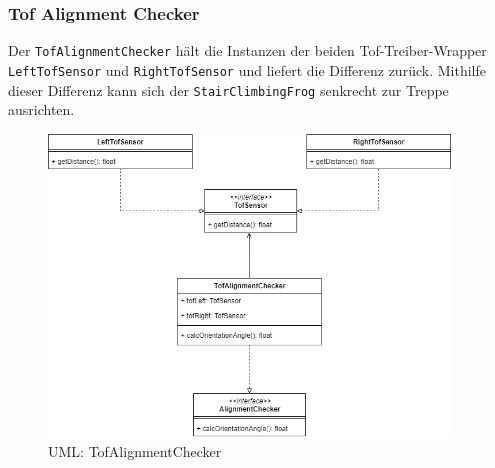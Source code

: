 \subsubsection{Tof Alignment Checker}
Der \texttt{TofAlignmentChecker} hält die Instanzen der beiden Tof-Treiber-Wrapper \texttt{LeftTofSensor} und \texttt{RightTofSensor} und liefert die Differenz zurück. Mithilfe dieser Differenz kann sich der \texttt{StairClimbingFrog} senkrecht zur Treppe ausrichten.
\begin{figure}[H]
  \includegraphics[width=0.95\textwidth]{img/softwarearchitektur/UML-TofAlignmentChecker.png}
  \centering
  \caption{UML: TofAlignmentChecker}
  \label{fig:uml-tof-alignment-checker}
\end{figure}


